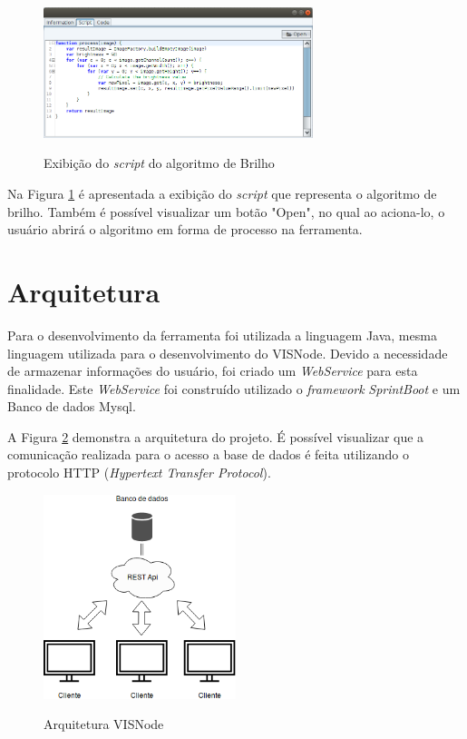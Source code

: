 \documentclass[
	12pt,				%
	oneside,			%
	a4paper,			%
	english,			%
	french,				%
	spanish,			%
	brazil,				%
	]{abntex2}
\begin{document}
\begin{figure}[ht]
\centering
\caption{Exibição do \textit{script} do algoritmo de Brilho}
\includegraphics[width=0.7\textwidth]{imagens/visnode_script.png}
\sourceAuthor
\label{fig:visnodeScript}
\end{figure}

Na Figura \ref{fig:visnodeScript} é apresentada a exibição do \textit{script} que representa o algoritmo de brilho. Também é possível visualizar um botão "Open", no qual ao aciona-lo, o usuário abrirá o algoritmo em forma de processo na ferramenta.

\section{Arquitetura}

Para o desenvolvimento da ferramenta foi utilizada a linguagem Java, mesma linguagem utilizada para o desenvolvimento do VISNode. Devido a necessidade de armazenar informações do usuário, foi criado um \textit{WebService} para esta finalidade. Este \textit{WebService} foi construído utilizado o \textit{framework} \textit{SprintBoot} e um Banco de dados Mysql.

A Figura \ref{fig:visnodeArquitetura} demonstra a arquitetura do projeto. É possível visualizar que a comunicação realizada para o acesso a base de dados é feita utilizando o protocolo HTTP (\textit{Hypertext Transfer Protocol}). 

\begin{figure}[ht]
\centering
\caption{Arquitetura VISNode}
\includegraphics[width=0.5\textwidth]{imagens/visnode_arquitetura.png}
\sourceAuthor
\label{fig:visnodeArquitetura}
\end{figure}
\end{document}
